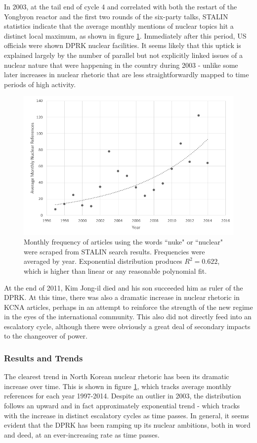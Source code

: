 \documentclass{article}
\begin{document}
In 2003, at the tail end of cycle 4 and correlated with both the restart of the Yongbyon reactor and the first two rounds of the six-party talks, STALIN statistics indicate that the average monthly mentions of nuclear topics hit a distinct local maximum, as shown in figure \ref{fig:kcna_refs}. Immediately after this period, US officials were shown DPRK nuclear facilities. It seems likely that this uptick is explained largely by the number of parallel but not explicitly linked issues of a nuclear nature that were happening in the country during 2003 - unlike some later increases in nuclear rhetoric that are less straightforwardly mapped to time periods of high activity.

\begin{figure}[H]
\centering
	\includegraphics[width=0.7\linewidth]{kcna_refs}
	\caption{Monthly frequency of articles using the words ``nuke" or ``nuclear" were scraped from STALIN search results. Frequencies were averaged by year. Exponential distribution produces $R^2=0.622$, which is higher than linear or any reasonable polynomial fit.}
\label{fig:kcna_refs}
\end{figure}


At the end of 2011, Kim Jong-il died and his son succeeded him as ruler of the DPRK. At this time, there was also a dramatic increase in nuclear rhetoric in KCNA articles, perhaps in an attempt to reinforce the strength of the new regime in the eyes of the international community\cite{rich14}. This also did not directly feed into an escalatory cycle, although there were obviously a great deal of secondary impacts to the changeover of power.

\subsubsection{Results and Trends}

The clearest trend in North Korean nuclear rhetoric has been its dramatic increase over time. This is shown in figure \ref{fig:kcna_refs}, which tracks average monthly references for each year 1997-2014. Despite an outlier in 2003, the distribution follows an upward and in fact approximately exponential trend - which tracks with the increase in distinct escalatory cycles as time passes. In general, it seems evident that the DPRK has been ramping up its nuclear ambitions, both in word and deed, at an ever-increasing rate as time passes.
\end{document}
